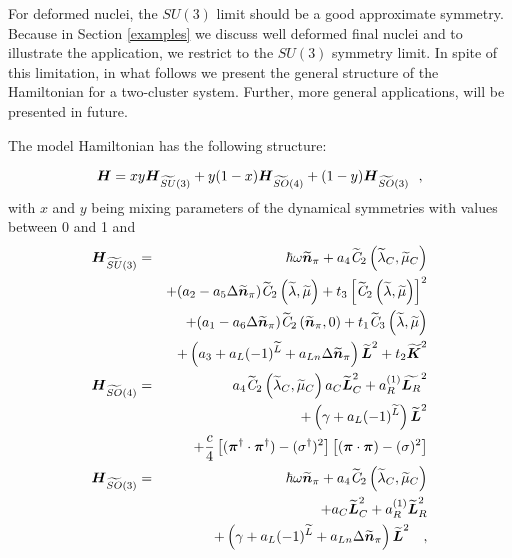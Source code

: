 \documentclass[12pt]{article}
\newcommand{\bd}[1]{ \mbox{\boldmath $#1$}}
\begin{document}
For deformed nuclei, the $SU(3)$ limit should be a good approximate symmetry. Because
in  Section \ref{examples} we discuss well deformed final nuclei and to illustrate the
application, we restrict to the $SU(3)$ symmetry limit. In spite of this limitation, in what follows
we present the general structure of the Hamiltonian for a two-cluster system.
Further, more general applications, will be presented in future.

The model Hamiltonian has the following structure:

\begin{equation}
{\bd H}  =  xy{\bd H}_{\widetilde{SU}(3)} 
+ y(1-x){\bd H}_{\widetilde{SO}(4)}+(1-y){\bd H}_{\widetilde{SO}(3)} \:\:\:,
\label{H-tot}
\end{equation}
with $x$ and $y$ being mixing parameters of the dynamical symmetries
with values between 0 and 1 and 
\begin{eqnarray}
{\bd H}_{\widetilde{SU}(3)} & = &
\hbar \omega \mbox{\boldmath$\widetilde{n}$}_{\pi }
+a_{4} \mathit{\widetilde{C}}_{2}\left( \widetilde{\lambda} _{C},\widetilde{\mu} _{C}\right)
\nonumber \\
&&
+(a_2-a_5\Delta
\mbox{\boldmath$\widetilde{n}$}_{\pi })\mathit{\widetilde{C}}_{2}
\left( \widetilde{\lambda} ,\widetilde{\mu} \right)  
+ t_3 \left[ \mathit{\widetilde{C}}_{2}
\left( \widetilde{\lambda} ,\widetilde{\mu} \right) \right]^2
\nonumber \\
&&
+(a_1-a_6\Delta
\mbox{\boldmath$\widetilde{n}$}_{\pi })\mathit{\widetilde{C}}_{2}
\left( \widetilde{{\bd n}}_\pi ,0 \right) 
+ t_1\mathit{\widetilde{C}}_3\left( \widetilde{\lambda} , \widetilde{\mu} \right)
\nonumber \\
&&
+\left( a_3 + a_L (-1)^{\widetilde{L}} + a_{Ln} \Delta \widetilde{{\bd n}}_\pi \right)
{\mbox{\boldmath$\widetilde{L}$}}^{2}+t_2{\mbox{\boldmath$\widetilde{K}$}}^{2}
\nonumber \\
{\bd H}_{\widetilde{SO}(4)} & = & 
a_{4} \mathit{\widetilde{C}}_{2}\left( \widetilde{\lambda} _{C},\widetilde{\mu} _{C}\right)
a_{C}{\widetilde{{\bd L}}_{C}}^{2}
+a_{R}^{\left( 1\right) }{\widetilde{{\bd L}_{R}}}%
^{2}
\nonumber \\
&&
+\left( \gamma + a_L (-1)^{\widetilde{L}} \right)
{\widetilde{{\bd L}}}^{2}
\nonumber \\
&&
+\frac{c}{4}\left[ (\mbox{\boldmath$\pi$}^{\dagger }\cdot %
\mbox{\boldmath$\pi$}^{\dagger })-(\sigma ^{\dagger })^{2}\right] \left[ (%
\mbox{\boldmath$\pi$}\cdot \mbox{\boldmath$\pi$})-(\sigma )^{2}\right] 
\nonumber \\
{\bd H}_{\widetilde{SO}(3)} & = &
\hbar \omega   \mbox{\boldmath$\widetilde{ n}$}_{\pi } 
+a_4
\mathit{\widetilde{C}}_{2}\left( \widetilde{\lambda}_{C},\widetilde{\mu}_{C}\right)  \nonumber \\
&&+a_{C}{\widetilde{{\bd L}}_{C}}^{2}+a_{R}^{\left( 1\right) }{\widetilde{{\bd L}}}%
_{R}^{2}
\nonumber \\
&&
+\left( \gamma + a_L (-1)^{\widetilde{L}} + a_{Ln} \Delta \widetilde{{\bd n}}_\pi \right)
{\mbox{\boldmath$\widetilde{L}$}}^{2}
~~~,
\label{one-d}
\end{eqnarray}
\end{document}
